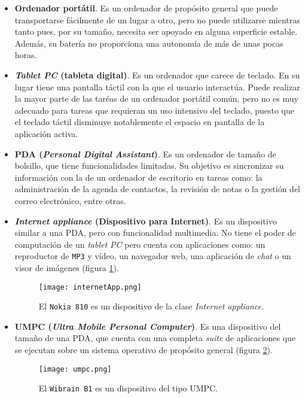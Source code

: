 \begin{itemize}
\item \textbf{Ordenador portátil}. Es un ordenador de propósito general
que puede transportarse fácilmente de un lugar a otro, pero no puede utilizarse 
mientras tanto pues, por su tamaño, necesita ser apoyado en alguna superficie 
estable. Además, su batería no proporciona una autonomía de más de unas pocas
horas.
\item \textbf{\emph{Tablet PC} (tableta digital)}. Es un ordenador que carece 
de teclado. En su lugar tiene una pantalla táctil con la que el usuario 
interactúa. Puede realizar la mayor parte de las taréas de un ordenador 
portátil común, pero no es muy adecuado para tareas que requieran un uso 
intensivo del teclado, puesto que el teclado táctil disminuye notablemente el 
espacio en pantalla de la aplicación activa.
\item \textbf{\acs{PDA} (\emph{Personal Digital Assistant})}. Es un
ordenador de tamaño de bolsillo, que tiene funcionalidades limitadas. Su
objetivo es sincronizar su información con la de un ordenador de escritorio
en tareas como: la administración de la agenda de contactos, la revisión de
notas o la gestión del correo electrónico, entre otras.
\item \textbf{\emph{Internet appliance} (Dispositivo para Internet)}. Es un 
dispositivo similar a una \acs{PDA}, pero con funcionalidad multimedia. No 
tiene el poder de computación de un \emph{tablet PC} pero cuenta con 
aplicaciones como: un reproductor de \texttt{MP3} y vídeo, un navegador web, 
una aplicación de \emph{chat} o un visor de imágenes (figura
\ref{fig:internetApp}).

  \begin{figure}[h]
    \begin{center}
      \texttt{[image: internetApp.png]}
      \caption{El \texttt{Nokia 810} es un dispositivo de la clase
      \emph{Internet appliance}.}
      \label{fig:internetApp}
    \end{center}
  \end{figure}

\item \textbf{\acs{UMPC} (\emph{Ultra Mobile Personal Computer})}. Es una
dispositivo del tamaño de una \acs{PDA}, que cuenta con una completa 
\emph{suite} de aplicaciones que se ejecutan sobre un sistema operativo de 
propósito general (figura \ref{fig:umpc}).

  \begin{figure}[h]
    \begin{center}
      \texttt{[image: umpc.png]}
      \caption{El \texttt{Wibrain B1} es un dispositivo del tipo \acs{UMPC}.}
      \label{fig:umpc}
    \end{center}
  \end{figure}


\end{itemize}
